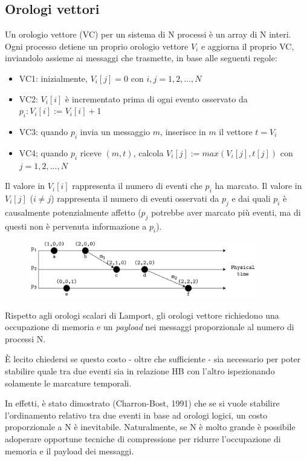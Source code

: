 \subsection{Orologi vettori}
Un orologio vettore (VC) per un sistema di N processi è un array di N interi. Ogni processo detiene un proprio orologio vettore $V_{i}$ e aggiorna il proprio VC, inviandolo assieme ai messaggi che trasmette, in base alle seguenti regole:
\begin{itemize}
    \item VC1: inizialmente, $V_{i}[j] = 0$ con $i, j = 1, 2, ..., N$
    \item VC2: $V_{i}[i]$ è incrementato prima di ogni evento osservato da $p_{i}: V_{i}[i] := V_{i}[i] + 1$
    \item VC3: quando $p_{i}$ invia un messaggio $m$, inserisce in $m$ il vettore $t = V_{i}$
    \item VC4; quando $p_{i}$ riceve $(m,t)$, calcola $V_{i}[j] := max(V_{i}[j],t[j])$ con $j = 1, 2, ..., N$
\end{itemize}
Il valore in $V_{i}[i]$ rappresenta il numero di eventi che $p_{i}$ ha marcato. Il valore in  $V_{i}[j]$ ($i \neq j$) rappresenta il numero di eventi osservati da $p_{j}$ e dai quali $p_{i}$ è causalmente potenzialmente affetto ($p_{j}$ potrebbe aver marcato più eventi, ma di questi non è pervenuta informazione a $p_{i}$).

\begin{figure}[hbt!]
    \centering
    \includegraphics[width=10cm]{./Images/cap3/3.5.png}
\end{figure}

Rispetto agli orologi scalari di Lamport, gli orologi vettore richiedono una occupazione di memoria e un \textit{payload} nei messaggi proporzionale al numero di processi N.

È lecito chiedersi se questo costo - oltre che sufficiente - sia necessario per poter stabilire quale tra due eventi sia in relazione HB con l'altro ispezionando solamente le marcature temporali.

In effetti, è stato dimostrato (Charron-Bost, 1991) che se si vuole stabilire l'ordinamento relativo tra due eventi in base ad orologi logici, un costo proporzionale a N è inevitabile. Naturalmente, se N è molto grande è possibile adoperare opportune tecniche di compressione per ridurre l'occupazione di memoria e il payload dei messaggi.

